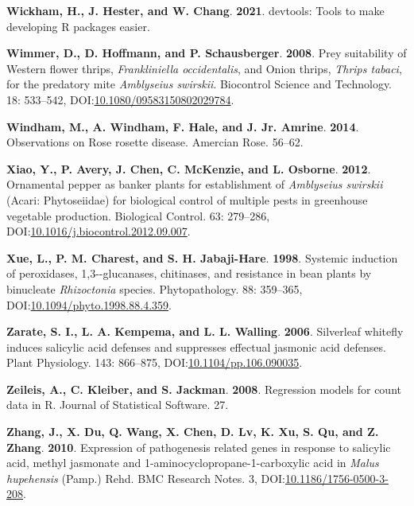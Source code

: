 \documentclass[12pt,final,CPage]{ufthesis}
\newlength{\cslhangindent}
\newenvironment{CSLReferences}[2] %
{%
	\setlength{\parindent}{0pt}
	\ifodd #1 \everypar{\setlength{\hangindent}{\cslhangindent}}\ignorespaces\fi
	\ifnum #2 > 0
	\setlength{\parskip}{#2\baselineskip}
	\fi
}%
{}
\begin{document}
{\begin{CSLReferences}{1}{0}
  \leavevmode{}%
  \textbf{Wickham, H., J. Hester, and W. Chang}. \textbf{2021}. {devtools}: Tools to make developing {R} packages easier.

  \leavevmode{}%
  \textbf{Wimmer, D., D. Hoffmann, and P. Schausberger}. \textbf{2008}. Prey suitability of {Western flower thrips}, {\emph{Frankliniella occidentalis}}, and {Onion thrips}, {\emph{Thrips tabaci}}, for the predatory mite {\emph{Amblyseius swirskii}}. Biocontrol Science and Technology. 18: 533--542, DOI:\href{https://doi.org/10.1080/09583150802029784}{10.1080/09583150802029784}.

  \leavevmode{}%
  \textbf{Windham, M., A. Windham, F. Hale, and J. Jr. Amrine}. \textbf{2014}. Observations on {Rose rosette disease}. Amercian Rose. 56--62.

  \leavevmode{}%
  \textbf{Xiao, Y., P. Avery, J. Chen, C. McKenzie, and L. Osborne}. \textbf{2012}. Ornamental pepper as banker plants for establishment of {\emph{Amblyseius swirskii}} ({Acari}: {Phytoseiidae}) for biological control of multiple pests in greenhouse vegetable production. Biological Control. 63: 279--286, DOI:\href{https://doi.org/10.1016/j.biocontrol.2012.09.007}{10.1016/j.biocontrol.2012.09.007}.

  \leavevmode{}%
  \textbf{Xue, L., P. M. Charest, and S. H. Jabaji-Hare}. \textbf{1998}. Systemic induction of peroxidases, 1,3-\textbeta-glucanases, chitinases, and resistance in bean plants by binucleate {\emph{Rhizoctonia}} species. Phytopathology{\textregistered}. 88: 359--365, DOI:\href{https://doi.org/10.1094/phyto.1998.88.4.359}{10.1094/phyto.1998.88.4.359}.

  \leavevmode{}%
  \textbf{Zarate, S. I., L. A. Kempema, and L. L. Walling}. \textbf{2006}. Silverleaf whitefly induces salicylic acid defenses and suppresses effectual jasmonic acid defenses. Plant Physiology. 143: 866--875, DOI:\href{https://doi.org/10.1104/pp.106.090035}{10.1104/pp.106.090035}.

  \leavevmode{}%
  \textbf{Zeileis, A., C. Kleiber, and S. Jackman}. \textbf{2008}. Regression models for count data in {R}. Journal of Statistical Software. 27.

  \leavevmode{}%
  \textbf{Zhang, J., X. Du, Q. Wang, X. Chen, D. Lv, K. Xu, S. Qu, and Z. Zhang}. \textbf{2010}. Expression of pathogenesis related genes in response to salicylic acid, methyl jasmonate and 1-aminocyclopropane-1-carboxylic acid in {\emph{Malus hupehensis}} ({Pamp.}) {Rehd}. {BMC} Research Notes. 3, DOI:\href{https://doi.org/10.1186/1756-0500-3-208}{10.1186/1756-0500-3-208}.


\end{CSLReferences}}
\end{document}
